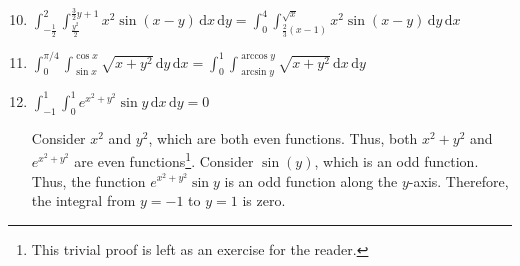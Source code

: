 \documentclass[11pt]{article}
\begin{document}
\begin{enumerate}
  \setcounter{enumi}{9}
  
\item
  \(\int_{-\frac{1}{2}}^{2} \int_{\frac{y^2}{2}}^{\frac{3}{2}y+1} x^2 \sin(x-y)
  \,\mathrm{d}x\,\mathrm{d}y= \int_0^4 \int_{\frac{2}{3}(x-1)}^{\sqrt{x}} x^2
  \sin(x-y) \, \mathrm{d}y \, \mathrm{d}x\)

\item
  \(\int_0^{\pi/4} \int_{\sin x}^{\cos x} \sqrt{x + y^2} \, \mathrm{d}y\,
  \mathrm{d}x= \int_0^1 \int_{\arcsin y}^{\arccos y} \sqrt{x + y^2} \,
  \mathrm{d}x\, \mathrm{d}y\)

\item
  \(\int_{-1}^{1} \int_{0}^{1} e^{x^2 + y^2} \sin y \, \mathrm{d}x\,
  \mathrm{d}y= 0\)

  Consider \(x^2\) and \(y^2\), which are both even functions. Thus, both
  \(x^2 + y^2\) and \(e^{x^2 + y^2}\) are even
  functions\footnote{\label{fn:trivial} This trivial proof is left as an
    exercise for the reader.}. Consider \(\sin(y)\), which is an odd
  function\footnotemark[\value{footnote}]. Thus, the function
  \(e^{x^2 + y^2} \sin y\) is an odd function along the
  \(y\)-axis\footnotemark[\value{footnote}]. Therefore, the integral from
  \(y = -1\) to \(y = 1\) is zero.
\end{enumerate}
\end{document}
